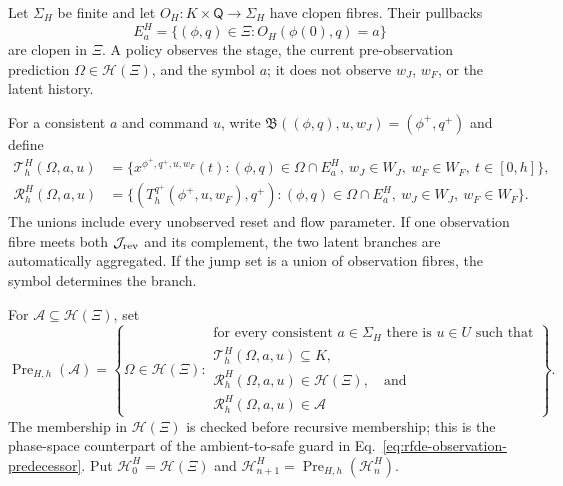 \documentclass[11pt]{article}
\theoremstyle{definition}
\newcommand{\Pre}{\operatorname{Pre}}
\begin{document}
Let $\Sigma_H$ be finite and let
$O_H:K\times\mathsf Q\to\Sigma_H$ have clopen fibres.  Their pullbacks
\[
E_a^H=\{(\phi,q)\in\Xi:O_H(\phi(0),q)=a\}
\]
are clopen in $\Xi$.  A policy observes the stage, the current
pre-observation prediction $\Omega\in\mathcal H(\Xi)$, and the symbol $a$;
it does not observe $w_J$, $w_F$, or the latent history.

For a consistent $a$ and command $u$, write
$\mathfrak B((\phi,q),u,w_J)=(\phi^+,q^+)$ and define
\begin{align*}
\mathscr T_h^H(\Omega,a,u)
&=\{x^{\phi^+,q^+,u,w_F}(t):
(\phi,q)\in\Omega\cap E_a^H,\ w_J\in W_J,\ w_F\in W_F,\
 t\in[0,h]\},\\
\mathscr R_h^H(\Omega,a,u)
&=\{(T_h^{q^+}(\phi^+,u,w_F),q^+):
(\phi,q)\in\Omega\cap E_a^H,\ w_J\in W_J,\ w_F\in W_F\}.
\end{align*}
The unions include every unobserved reset and flow parameter.  If one
observation fibre meets both $\mathcal J_{\rm rev}$ and its complement, the
two latent branches are automatically aggregated.  If the jump set is a
union of observation fibres, the symbol determines the branch.

For $\mathcal A\subseteq\mathcal H(\Xi)$, set
\begin{equation}
\Pre_{H,h}(\mathcal A)=
\left\{\Omega\in\mathcal H(\Xi):
\begin{array}{l}
\text{for every consistent }a\in\Sigma_H\text{ there is }u\in U
\text{ such that}\\[-1mm]
\mathscr T_h^H(\Omega,a,u)\subseteq K,\\[-1mm]
\mathscr R_h^H(\Omega,a,u)\in\mathcal H(\Xi),\quad\text{and}\\[-1mm]
\mathscr R_h^H(\Omega,a,u)\in\mathcal A
\end{array}\right\}.
\label{eq:review-hybrid-predecessor}
\end{equation}
The membership in $\mathcal H(\Xi)$ is checked before recursive membership;
this is the phase-space counterpart of the ambient-to-safe guard in
Eq.~\eqref{eq:rfde-observation-predecessor}.  Put
$\mathcal H_0^H=\mathcal H(\Xi)$ and
$\mathcal H_{n+1}^H=\Pre_{H,h}(\mathcal H_n^H)$.
\end{document}
